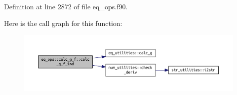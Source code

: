 Definition at line 2872 of file eq\+\_\+ops.\+f90.

Here is the call graph for this function\+:\nopagebreak
\begin{figure}[H]
\begin{center}
\leavevmode
\includegraphics[width=350pt]{interfaceeq__ops_1_1calc__g__f_a2c6ba8f85bc6ab16e69d4ec2ccaa317a_cgraph}
\end{center}
\end{figure}


